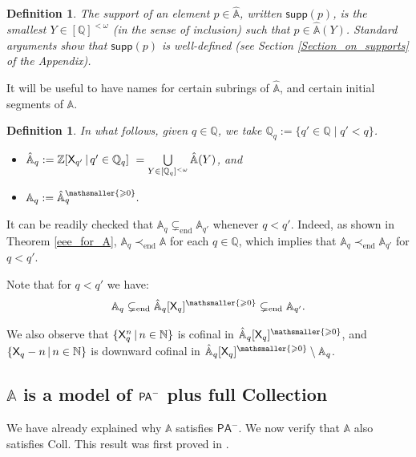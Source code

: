 \documentclass{amsart}
\newcommand{\qee} {\hspace*{2mm}\hfill \ding{109}}
\renewcommand{\geq}{\geqslant}
\newtheorem{define}[theorem]{Definition}
\newenvironment{definition}{\begin{define} \rm}{\qee\end{define}}
\newcommand{\pam}{\ensuremath{{\sf PA}^{-}}}
\newcommand{\X}{{\sf X}}
\newcommand{\fsvar}{Y}
\begin{document}
\begin{definition}The \emph{support} of an element $p\in\hat{\mathbb{A}}$, written $\mathsf{supp}(p)$, is the smallest $\fsvar\in[\mathbb{Q}]^{<\omega}$ (in the sense of inclusion) such that $p\in \hat{\mathbb{A}}(\fsvar)$. Standard arguments show that $\mathsf{supp}(p)$ is well-defined (see Section \ref{Section_on_supports} of the Appendix).
\end{definition}

It will be useful to have names for certain subrings of  $\hat{\mathbb{A}}$, and certain initial segments of $\mathbb{A}$. 

\begin{definition}
    In what follows, given $q\in\mathbb{Q}$, we take $\mathbb{Q}_q:=\{q'\in \mathbb{Q}\mathop\mid q'<q\}$.
 \begin{itemize}
\item $\hat{\mathbb{A}}_{q}:=\mathbb {Z}[\X_{q'}\mathop\mid q'\in \mathbb Q_{q}]~=\bigcup\limits_{\fsvar\in [\mathbb{Q}_{q}]^{<\omega}}\hat{\mathbb{A}}(\fsvar)$, and
\item $\mathbb{A}_{q}:=\hat{\mathbb{A}}_{q}^{\mathsmaller{\geq 0}}.$
\end{itemize}
\end{definition}
It can be readily checked that $\mathbb{A}_{q}\subsetneq_{\mathrm{end}} \mathbb{A}_{q'}$ whenever $q<q'$. Indeed, as shown in Theorem \ref{eee_for_A}, $\mathbb{A}_{q}\prec_{\mathrm{end}} \mathbb{A}$ for each $q\in \mathbb{Q}$, which implies that $\mathbb{A}_{q}\prec_{\mathrm{end}} \mathbb{A}_{q'}$ for $q<q'$. 

Note that for $q<q'$ we have: $$\mathbb{A}_q\subsetneq_{\mathrm{end}} \hat{\mathbb{A}}_q [\X_q]^{\mathsmaller{\geq 0}}\subsetneq_{\mathrm{end}} \mathbb{A}_{q'}.$$ 

We also observe that $\{\X_{q}^{n} \mathop\mid n\in \mathbb{N}\}$ is cofinal in $\hat{\mathbb{A}}_q [\X_q]^{\mathsmaller{\geq 0}}$, and $\{\X_{q}-n \mathop\mid n\in \mathbb{N}\}$ is downward cofinal in $\hat{\mathbb{A}}_q [\X_q]^{\mathsmaller{\geq 0}} \setminus \mathbb{A}_q$.

\subsection{$\mathbb A$ is a model of $\pam$ plus full Collection}
We have already explained why $\mathbb{A}$ satisfies $\mathsf{PA^-}$. We now verify that $\mathbb{A}$ also satisfies
{\sf Coll}. This result was first proved in \cite[Corollary 34]{enlel:cat24}.
\end{document}
